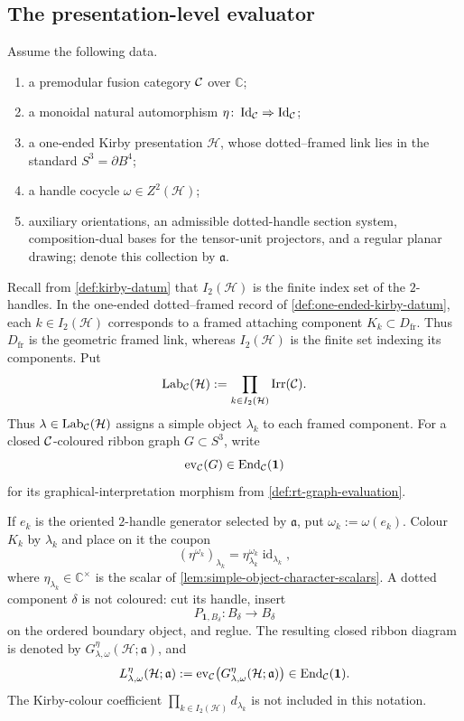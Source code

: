 \subsection{The presentation-level evaluator}
\label{subsec:graphical-construction}

\begin{definition}
\label{def:decorated-kirby-graph}
\label{def:dotted-circle-translation}
Assume the following data.
\begin{enumerate}[label=\textup{(\roman*)}]
\item a premodular fusion category \(\mathcal{C}\) over \(\mathbb C\);
\item a monoidal natural automorphism
  \(\eta\colon\operatorname{Id}_{\mathcal{C}}\Rightarrow
  \operatorname{Id}_{\mathcal{C}}\);
\item a one-ended Kirby presentation \(\mathcal H\), whose dotted--framed
  link lies in the standard \(S^3=\partial B^4\);
\item a handle cocycle \(\omega\in Z^2(\mathcal H)\);
\item auxiliary orientations, an admissible dotted-handle section system,
  composition-dual bases for the tensor-unit projectors, and a regular planar
  drawing; denote this collection by \(\mathfrak a\).
\end{enumerate}
Recall from \cref{def:kirby-datum} that \(I_2(\mathcal H)\) is the finite
index set of the \(2\)-handles.  In the one-ended dotted--framed record of
\cref{def:one-ended-kirby-datum}, each \(k\in I_2(\mathcal H)\) corresponds
to a framed attaching component \(K_k\subset D_{\mathrm{fr}}\).  Thus
\(D_{\mathrm{fr}}\) is the geometric framed link, whereas
\(I_2(\mathcal H)\) is the finite set indexing its components.  Put
\[
  \operatorname{Lab}_{\mathcal{C}}(\mathcal H)
  :=\prod_{k\in I_2(\mathcal H)}\operatorname{Irr}(\mathcal{C}).
\]
Thus \(\lambda\in\operatorname{Lab}_{\mathcal{C}}(\mathcal H)\) assigns a simple
object \(\lambda_k\) to each framed component.  For a closed
\(\mathcal{C}\)-coloured ribbon graph \(G\subset S^3\), write
\[
  \operatorname{ev}_{\mathcal{C}}(G)
  \in\operatorname{End}_{\mathcal{C}}(\mathbf1)
\]
for its graphical-interpretation morphism from
\cref{def:rt-graph-evaluation}.

If \(e_k\) is the oriented \(2\)-handle generator selected by
\(\mathfrak a\), put \(\omega_k:=\omega(e_k)\).  Colour \(K_k\) by
\(\lambda_k\) and place on it the coupon
\[
  (\eta^{\omega_k})_{\lambda_k}
  =\eta_{\lambda_k}^{\omega_k}\operatorname{id}_{\lambda_k},
\]
where \(\eta_{\lambda_k}\in\mathbb C^\times\) is the scalar of
\cref{lem:simple-object-character-scalars}.  A dotted component \(\delta\)
is not coloured: cut its handle, insert
\[
  P_{\mathbf1,B_\delta}\colon B_\delta\longrightarrow B_\delta
\]
on the ordered boundary object, and reglue.  The resulting closed ribbon
diagram is denoted by
\(G^\eta_{\lambda,\omega}(\mathcal H;\mathfrak a)\), and
\[
  L^\eta_{\lambda,\omega}(\mathcal H;\mathfrak a)
  :=\operatorname{ev}_{\mathcal{C}}\bigl(
       G^\eta_{\lambda,\omega}(\mathcal H;\mathfrak a)\bigr)
  \in\operatorname{End}_{\mathcal{C}}(\mathbf1).
\]
The Kirby-colour coefficient
\(\prod_{k\in I_2(\mathcal H)}d_{\lambda_k}\) is not included in this
notation.
\end{definition}

